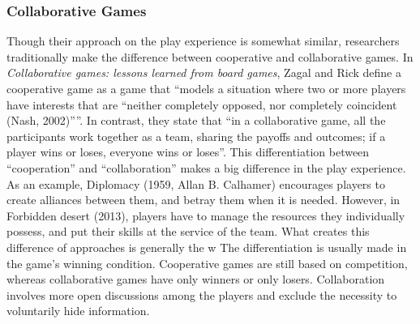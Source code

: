\subsubsection{Collaborative Games}
Though their approach on the play experience is somewhat similar, researchers traditionally make the difference between cooperative and collaborative games. In \textit{Collaborative games: lessons learned from board games}, Zagal and Rick define a cooperative game as a game that “models a situation where two or more players have interests that are “neither completely opposed, nor completely coincident (Nash, 2002)””. In contrast, they state that “in a collaborative game, all the participants work together as a team, sharing the payoffs and outcomes; if a player wins or loses, everyone wins or loses”. This differentiation between “cooperation” and “collaboration” makes a big difference in the play experience. As an example, Diplomacy (1959, Allan B. Calhamer) encourages players to create alliances between them, and betray them when it is needed. However, in Forbidden desert (2013), players have to manage the resources they individually possess, and put their skills at the service of the team. What creates this difference of approaches is generally the w
The differentiation is usually made in the game’s winning condition. Cooperative games are still based on competition, whereas collaborative games have only winners or only losers. Collaboration involves more open discussions among the players and exclude the necessity to voluntarily hide information. 


